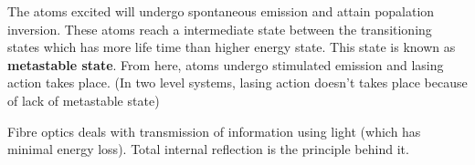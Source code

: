 \documentclass[12pt, a4paper]{article}
\begin{document}








The atoms excited will undergo spontaneous emission and attain popalation inversion. These atoms reach a intermediate state between the transitioning states which has more life time than higher energy state. This state is known as \textbf{metastable state}. From here, atoms undergo stimulated emission and lasing action takes place. (In two level systems, lasing action doesn't takes place because of lack of metastable state)





\vspace{1.5cm}











\vspace{1.5cm}



Fibre optics deals with transmission of information using light (which has minimal energy loss). Total internal reflection is the principle behind it.







\vspace{1.5cm}






\end{document}

